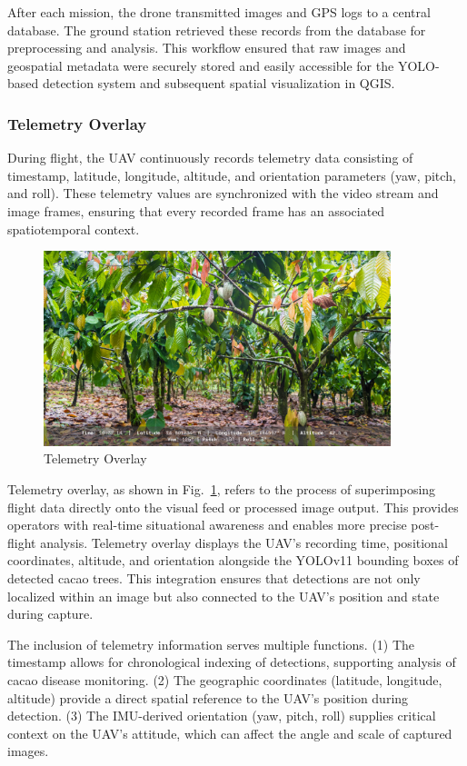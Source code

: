After each mission, the drone transmitted images and GPS logs to a central database. The ground station retrieved these records from the database for preprocessing and analysis. This workflow ensured that raw images and geospatial metadata were securely stored and easily accessible for the YOLO-based detection system and subsequent
spatial visualization in QGIS.

\subsubsection*{Telemetry Overlay}

During flight, the UAV continuously records telemetry data consisting of timestamp, latitude, longitude, altitude, and orientation parameters (yaw, pitch, and roll). These telemetry values are synchronized with the video stream and image frames, ensuring that every recorded frame has an associated spatiotemporal context.

\begin{figure}[H]
	\centering
	\caption{Telemetry Overlay}
	\label{fig:telemetry_overlay}
	\includegraphics[width=0.9\textwidth]{figures/Telemetry.pdf}
\end{figure}

Telemetry overlay, as shown in Fig.~\ref{fig:telemetry_overlay}, refers to the process of superimposing flight data directly onto the visual feed or processed image output. This provides operators with real-time situational awareness and enables more precise post-flight analysis. Telemetry overlay displays the UAV’s recording time, positional coordinates, altitude, and orientation alongside the YOLOv11 bounding boxes of detected cacao trees. This integration ensures that detections are not only localized within an image but also connected to the UAV’s position and state during capture.

The inclusion of telemetry information serves multiple functions.
(1) The timestamp allows for chronological indexing of detections, supporting analysis of cacao disease monitoring.
(2) The geographic coordinates (latitude, longitude, altitude) provide a direct spatial reference to the UAV’s position during detection.
(3) The IMU-derived orientation (yaw, pitch, roll) supplies critical context on the UAV’s attitude, which can affect the angle and scale of captured images.

